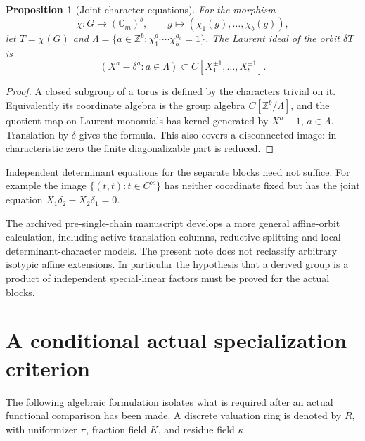 \documentclass[11pt]{article}
\numberwithin{equation}{section}
\newtheorem{proposition}[proposition]{Proposition}
\theoremstyle{definition}
\theoremstyle{remark}
\newcommand{\Z}{\mathbb Z}
\newcommand{\Gm}{\mathbb G_m}
\begin{document}
\begin{proposition}[Joint character equations]\label{prop:lattice}
For the morphism
\[
 \chi:G\longrightarrow(\Gm)^b,\qquad
 g\longmapsto(\chi_1(g),\ldots,\chi_b(g)),
\]
let $T=\chi(G)$ and
$\Lambda=\{a\in\Z^b: \chi_1^{a_1}\cdots\chi_b^{a_b}=1\}$.
The Laurent ideal of the orbit $\delta T$ is
\[
 (X^a-\delta^a:a\in\Lambda)
 \subset C[X_1^{\pm1},\ldots,X_b^{\pm1}].
\]
\end{proposition}
\begin{proof}
A closed subgroup of a torus is defined by the characters trivial on it.
Equivalently its coordinate algebra is the group algebra
$C[\Z^b/\Lambda]$, and the quotient map on Laurent monomials has kernel
generated by $X^a-1$, $a\in\Lambda$. Translation by $\delta$ gives the
formula. This also covers a disconnected image: in characteristic zero
the finite diagonalizable part is reduced.
\end{proof}
Independent determinant equations for the separate blocks need not
suffice. For example the image $\{(t,t):t\in C^\times\}$ has neither
coordinate fixed but has the joint equation
$X_1\delta_2-X_2\delta_1=0$.

The archived pre-single-chain manuscript \cite{Archive} develops a more
general affine-orbit calculation, including active translation columns,
reductive splitting and local determinant-character models. The present
note does not reclassify arbitrary isotypic affine extensions. In
particular the hypothesis that a derived group is a product of
independent special-linear factors must be proved for the actual blocks.

\section{A conditional actual specialization criterion}
The following algebraic formulation isolates what is required after an
actual functional comparison has been made. A discrete valuation ring
is denoted by $R$, with uniformizer $\pi$, fraction field $K$, and residue
field $\kappa$.
\end{document}
